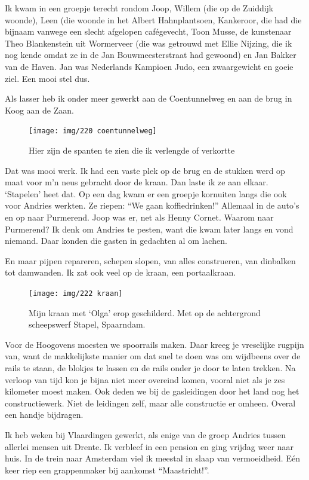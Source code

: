 \documentclass[10pt,twoside, openright]{memoir}
\begin{document}
Ik kwam in een groepje terecht rondom Joop, Willem (die op de Zuiddijk woonde), Leen (die woonde in het Albert Hahnplantsoen, Kankeroor, die had die bijnaam vanwege een slecht afgelopen cafégevecht, Toon Musse, de kunstenaar Theo Blankenstein uit Wormerveer (die was  getrouwd met Ellie Nijzing, die ik nog kende omdat ze in de Jan Bouwmeesterstraat had gewoond) en Jan Bakker van de Haven. Jan was Nederlands Kampioen Judo, een zwaargewicht en goeie ziel. Een mooi stel dus.

Als lasser heb ik onder meer gewerkt aan de Coentunnelweg en aan de brug in Koog aan de Zaan. 

\begin{figure}[t]
\texttt{[image: img/220 coentunnelweg]}
\caption*{\footnotesize Hier zijn de spanten te zien die ik verlengde of verkortte}
\end{figure}

Dat was mooi werk. Ik had een vaste plek op de brug en de stukken werd op maat voor m’n neus gebracht door de kraan. Dan laste ik ze aan elkaar. `Stapelen' heet dat. Op een dag kwam er een groepje kornuiten langs die ook voor Andries werkten. Ze riepen: ``We gaan koffiedrinken!'' Allemaal in de auto’s en op naar Purmerend. Joop was er, net als Henny Cornet. Waarom naar Purmerend? Ik denk om Andries te pesten, want die kwam later langs en vond niemand. Daar konden die gasten in gedachten al om lachen.

En maar pijpen repareren, schepen slopen, van alles construeren, van dinbalken tot damwanden. Ik zat ook veel op de kraan, een portaalkraan. 

\begin{figure}
\texttt{[image: img/222 kraan]}
\caption*{\footnotesize Mijn kraan met ‘Olga’ erop geschilderd. Met op de achtergrond scheepswerf Stapel, Spaarndam.}
\end{figure}

Voor de Hoogovens moesten we spoorrails maken. Daar kreeg je vreselijke rugpijn van, want de makkelijkste manier om dat snel te doen was om wijdbeens over de rails te staan, de blokjes te lassen en de rails onder je door te laten trekken. Na verloop van tijd kon je bijna niet meer overeind komen, vooral niet als je zes kilometer moest maken. Ook deden we bij de gasleidingen door het land nog het constructiewerk. Niet de leidingen zelf, maar alle constructie er omheen. Overal een handje bijdragen.

Ik heb weken bij Vlaardingen gewerkt, als enige van de groep Andries tussen allerlei mensen uit Drente. Ik verbleef in een pension en ging vrijdag weer naar huis. In de trein naar Amsterdam viel ik meestal in slaap van vermoeidheid. Eén keer riep een grappenmaker bij aankomst ``Maastricht!''. 
\end{document}

